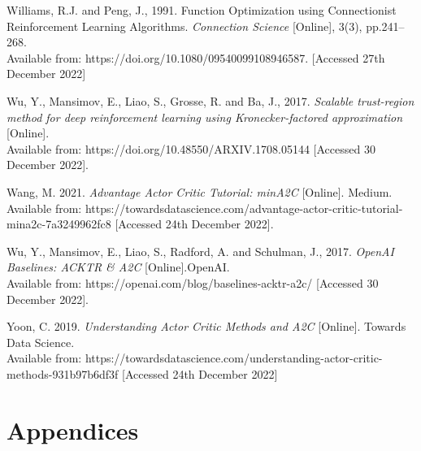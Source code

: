 \documentclass{article}
\begin{document}
Williams, R.J. and Peng, J., 1991. Function Optimization using Connectionist Reinforcement Learning Algorithms. \emph{Connection Science} [Online], 3(3), pp.241–268. \\
Available from: https://doi.org/10.1080/09540099108946587. [Accessed 27th December 2022]

Wu, Y., Mansimov, E., Liao, S., Grosse, R. and Ba, J., 2017. \emph{Scalable trust-region method for deep reinforcement learning using Kronecker-factored approximation} [Online]. \\
Available from: https://doi.org/10.48550/ARXIV.1708.05144 [Accessed 30 December 2022].

Wang, M. 2021. \emph{Advantage Actor Critic Tutorial: minA2C} [Online]. Medium. \\
Available from: https://towardsdatascience.com/advantage-actor-critic-tutorial-mina2c-7a3249962fc8 [Accessed 24th December 2022].

Wu, Y., Mansimov, E., Liao, S., Radford, A. and Schulman, J., 2017. \emph{OpenAI Baselines: ACKTR \& A2C} [Online].OpenAI. \\
Available from: https://openai.com/blog/baselines-acktr-a2c/ [Accessed 30 December 2022].

Yoon, C. 2019. \emph{Understanding Actor Critic Methods and A2C} [Online]. Towards Data Science. \\
Available from: https://towardsdatascience.com/understanding-actor-critic-methods-931b97b6df3f [Accessed 24th December 2022]

\normalsize
\newpage
\section*{Appendices}
\end{document}
